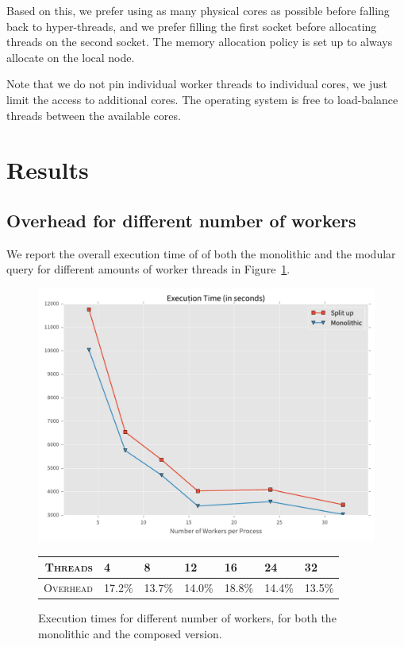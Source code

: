 Based on this, we prefer using as many physical cores as possible before falling back
to hyper-threads, and we prefer filling the first socket before allocating
threads on the second socket. The memory allocation policy is set up to
always allocate on the local node.

Note that we do not pin individual worker threads to individual cores, we just
limit the access to additional cores. The operating system is free to load-balance
threads between the available cores.

\section{Results}


\subsection{Overhead for different number of workers}

We report the overall execution time of of both the monolithic and the 
modular query for different amounts of worker threads in Figure~\ref{fig:times}.

\begin{figure}[htb]
  \centering
    \includegraphics[width=1\textwidth]{figures/evaluation/times}

    {\footnotesize
    \vspace{1em}
    \begin{tabularx}{\textwidth}{ rXXXXXX }
      \hline 
      \textsc{Threads} & 4 & 8 & 12 & 16 & 24 & 32 \\
      \hline 
      \textsc{Overhead} & 17.2\%&13.7\%&14.0\%&18.8\%&14.4\%&13.5\% \\
      \hline
    \end{tabularx}
    }
    \caption[Execution times for different number of workers]{
    Execution times for different number of workers, for both the monolithic
    and the composed version.}
    \label{fig:times}
\end{figure}

